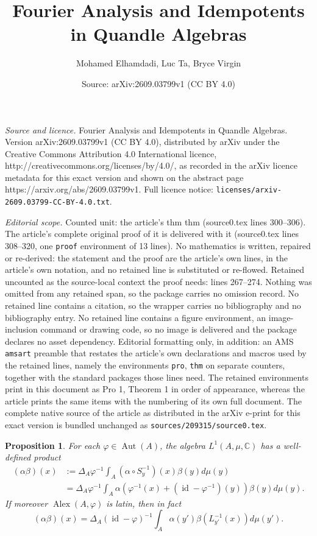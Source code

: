 \documentclass[10pt,a4paper]{amsart}
\title{Fourier Analysis and Idempotents in Quandle Algebras}
\author{Mohamed Elhamdadi, Luc Ta, Bryce Virgin}
\date{Source: arXiv:2609.03799v1 (CC BY 4.0)}
\newtheorem{pro}{Proposition}
\def\Alex{\operatorname{Alex}}
\def\Aut{\operatorname{Aut}}
\newcommand{\C}{\mathbb{C}}
\newcommand{\Id}{\operatorname{id}}
\renewcommand{\phi}{\varphi}
\begin{document}
\maketitle

\noindent\emph{Source and licence.} Fourier Analysis and Idempotents in Quandle Algebras. Version arXiv:2609.03799v1 (CC BY 4.0), distributed by arXiv under the Creative Commons Attribution 4.0 International licence, http://creativecommons.org/licenses/by/4.0/, as recorded in the arXiv licence metadata for this exact version and shown on the abstract page https://arxiv.org/abs/2609.03799v1. Full licence notice: \texttt{licenses/arxiv-2609.03799-CC-BY-4.0.txt}.\par\smallskip

\noindent\textit{Editorial scope.} Counted unit: the article's thm thm (source0.tex lines 300--306). The article's complete original proof of it is delivered with it (source0.tex lines 308--320, one \texttt{proof} environment of 13 lines). No mathematics is written, repaired or re-derived: the statement and the proof are the article's own lines, in the article's own notation, and no retained line is substituted or re-flowed.  Retained uncounted as the source-local context the proof needs: lines 267--274.  Nothing was omitted from any retained span, so the package carries no omission record.  No retained line contains a citation, so the wrapper carries no bibliography and no bibliography entry.  No retained line contains a figure environment, an image-inclusion command or drawing code, so no image is delivered and the package declares no asset dependency.  Editorial formatting only, in addition: an AMS \texttt{amsart} preamble that restates the article's own declarations and macros used by the retained lines, namely the environments \texttt{pro}, \texttt{thm} on separate counters, together with the standard packages those lines need.  The retained environments print in this document as Pro 1, Theorem 1 in order of appearance, whereas the article prints the same items with the numbering of its own full document.  The complete native source of the article as distributed in the arXiv e-print for this exact version is bundled unchanged as \texttt{sources/209315/source0.tex}.
\begin{pro}\label{pro:l1}
    For each $\phi\in\Aut(A)$, the algebra $L^1(A,\mu,\C)$ has a well-defined product
    \begin{align*}
        (\alpha \beta)(x) &:= \Delta_A\phi^{-1}\int_{ A}(\alpha \circ S_y^{-1})(x) \beta(y)d\mu(y)\\
        &= \Delta_A\phi^{-1}\int_{ A}\alpha (\phi^{-1}(x)+(\Id-\phi^{-1})(y) ) \beta(y)d\mu(y).
    \end{align*}
    If moreover $\Alex(A,\phi)$ is latin, then in fact \[ (\alpha \beta)(x) = \Delta_A(\Id-\phi)^{-1} \int_{ A}\alpha (y')   \beta(L_{y'}^{-1}(x))d\mu(y'). \]
\end{pro}
\end{document}
